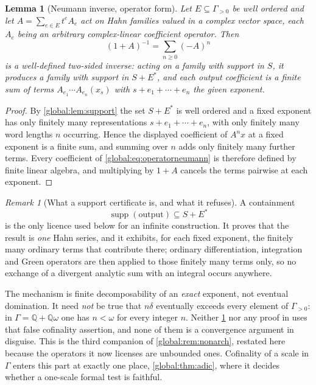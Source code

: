 \documentclass[11pt,letterpaper]{article}
\newtheorem{lemma}[lemma]{Lemma}
\theoremstyle{definition}
\theoremstyle{remark}
\newtheorem{remark}[remark]{Remark}
\newcommand{\Q}{\mathbb Q}
\newcommand{\supp}{\operatorname{supp}}
\numberwithin{equation}{section}
\begin{document}
\begin{lemma}[Neumann inverse, operator form]\label{global:lem:operatorneumann}
Let $E\subseteq\Gamma_{>0}$ be well ordered and let $A=\sum_{e\in E}t^eA_e$ act on Hahn families valued in a complex vector space, each $A_e$ being an arbitrary complex-linear coefficient operator. Then
\begin{equation}\label{global:eq:operatorneumann}
  (1+A)^{-1}=\sum_{n\ge0}(-A)^n
\end{equation}
is a well-defined two-sided inverse: acting on a family with support in $S$, it produces a family with support in $S+E^*$, and each output coefficient is a finite sum of terms $A_{e_1}\cdots A_{e_n}(x_s)$ with $s+e_1+\cdots+e_n$ the given exponent.
\end{lemma}

\begin{proof}
By \cref{global:lem:support} the set $S+E^*$ is well ordered and a fixed exponent has only finitely many representations $s+e_1+\cdots+e_n$, with only finitely many word lengths $n$ occurring. Hence the displayed coefficient of $A^nx$ at a fixed exponent is a finite sum, and summing over $n$ adds only finitely many further terms. Every coefficient of \eqref{global:eq:operatorneumann} is therefore defined by finite linear algebra, and multiplying by $1+A$ cancels the terms pairwise at each exponent.
\end{proof}

\begin{remark}[What a support certificate is, and what it refuses]\label{global:rem:certificate}
A containment
\begin{equation}\label{global:eq:certificate}
  \supp(\text{output})\subseteq S+E^*
\end{equation}
is the only licence used below for an infinite construction. It proves that the result is \emph{one} Hahn series, and it exhibits, for each fixed exponent, the finitely many ordinary terms that contribute there; ordinary differentiation, integration and Green operators are then applied to those finitely many terms only, so no exchange of a divergent analytic sum with an integral occurs anywhere.

The mechanism is finite decomposability of an \emph{exact} exponent, not eventual domination. It need \emph{not} be true that $n\delta$ eventually exceeds every element of $\Gamma_{>0}$: in $\Gamma=\Q+\Q\omega$ one has $n<\omega$ for every integer $n$. Neither \cref{global:lem:operatorneumann} nor any proof in  uses that false cofinality assertion, and none of them is a convergence argument in disguise. This is the third companion of \cref{global:rem:nonarch}, restated here because the operators it now licenses are unbounded ones. Cofinality of a scale in $\Gamma$ enters this part at exactly one place, \cref{global:thm:adic}, where it decides whether a one-scale formal test is faithful.
\end{remark}
\end{document}
